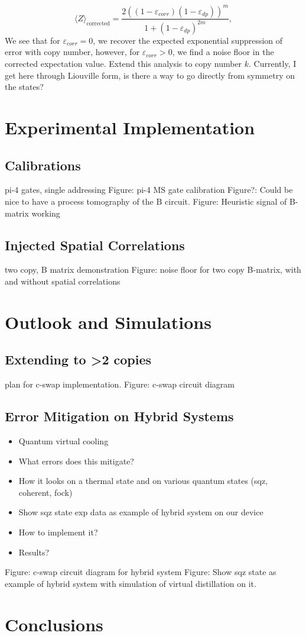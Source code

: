 \begin{equation}
    \langle Z \rangle_\mathrm{corrected} = \frac{2\left(\left(1-\varepsilon_{corr}\right)\left(1-\varepsilon_{dp}\right)\right)^m}{1+\left(1-\varepsilon_{dp}\right)^{2m}},
\end{equation}
We see that for $\varepsilon_{corr} = 0$, we recover the expected exponential suppression of error with copy number, however, for $\varepsilon_{corr} > 0$, we find a noise floor in the corrected expectation value.
Extend this analysis to copy number $k$. Currently, I get here through Liouville form, is there a way to go directly from symmetry on the states?


\section{Experimental Implementation}
    \subsection{Calibrations}
    pi-4 gates, single addressing
    Figure: pi-4 MS gate calibration
    Figure?: Could be nice to have a process tomography of the B circuit.
    Figure: Heuristic signal of B-matrix working
    \subsection{Injected Spatial Correlations}
    two copy, B matrix demonstration
    Figure: noise floor for two copy B-matrix, with and without spatial correlations

\section{Outlook and Simulations}
    \subsection{Extending to >2 copies}
    plan for c-swap implementation.
    Figure: c-swap circuit diagram

\subsection{Error Mitigation on Hybrid Systems}
    \begin{itemize}
        \item Quantum virtual cooling
        \item What errors does this mitigate? 
        \item How it looks on a thermal state and on various quantum states (sqz, coherent, fock)
        \item Show sqz state exp data as example of hybrid system on our device
        \item How to implement it? 
        \item Results?
    \end{itemize}
    Figure: c-swap circuit diagram for hybrid system
    Figure: Show sqz state as example of hybrid system with simulation of virtual distillation on it.

\section{Conclusions}